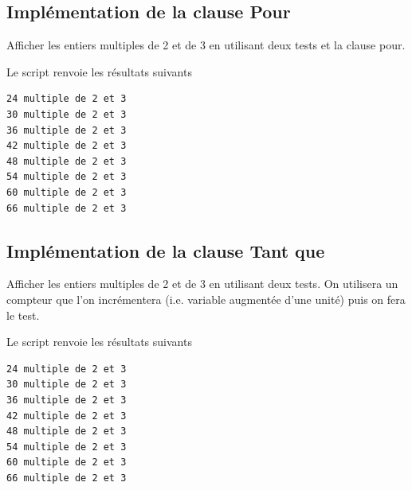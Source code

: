 \documentclass[a4paper,12pt]{article}
\begin{document}
\clearpage
\subsection{Impl\'ementation de la clause Pour}
\begin{leftbar}
Afficher les entiers multiples de 2 et de 3 en utilisant deux tests et la clause pour.
\end{leftbar}



Le script renvoie les résultats suivants
\begin{verbatim}
24 multiple de 2 et 3
30 multiple de 2 et 3
36 multiple de 2 et 3
42 multiple de 2 et 3
48 multiple de 2 et 3
54 multiple de 2 et 3
60 multiple de 2 et 3
66 multiple de 2 et 3\end{verbatim}
 
\clearpage    
\subsection{Impl\'ementation de la clause Tant que }
\begin{leftbar}
Afficher les entiers multiples de 2 et de 3 en utilisant deux tests. On utilisera un compteur que l'on incrémentera (i.e. variable augmentée d'une unité) puis on fera le test.
\end{leftbar}



Le script renvoie les résultats suivants
\begin{verbatim}
24 multiple de 2 et 3
30 multiple de 2 et 3
36 multiple de 2 et 3
42 multiple de 2 et 3
48 multiple de 2 et 3
54 multiple de 2 et 3
60 multiple de 2 et 3
66 multiple de 2 et 3
\end{verbatim}
 
\clearpage
\end{document}
